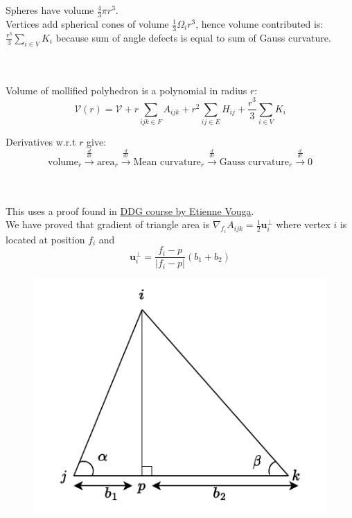 \documentclass{article}
\newcommand\ifrac[2]{{\displaystyle\frac{#1}{#2}}}
\def\grad{\nabla}
\def\hal{\ifrac{1}{2}}
\def\cV{\mathcal{V}}
\begin{document}
\vspace{1.8cm}
\\\\


Spheres have volume $\frac{4}{3}\pi r^3$.\\
Vertices add spherical cones of volume $\frac{1}{3} \Omega_i r^3$, hence volume contributed is:
$\frac{r^3}{3} \sum_{i \in V} K_i$
because sum of angle defects is equal to sum of Gauss curvature.


\vspace{1.8cm}
\\\\


Volume of mollified polyhedron is a polynomial in radius $r$:
$$
    \cV(r) = \cV + r \sum_{ijk \in F} A_{ijk} + r^2  \sum_{ij \in E} H_{ij} + \frac{r^3}{3} \sum_{i \in V} K_i
$$

Derivatives w.r.t $r$ give:\\
$$
    \text{volume}_r \overset{\frac{d}{dr}}{\longrightarrow}
    \text{area}_r \overset{\frac{d}{dr}}{\longrightarrow}
    \text{Mean curvature}_r \overset{\frac{d}{dr}}{\longrightarrow}
    \text{Gauss curvature}_r \overset{\frac{d}{dr}}{\longrightarrow} 0
$$


\pagebreak
{}\\\\

This uses a proof found in \href{https://www.cs.utexas.edu/users/evouga/uploads/4/5/6/8/45689883/notes3.pdf#page=4}{DDG course by Etienne Vouga}.\\
We have proved that gradient of triangle area is $\grad_{f_i} A_{ijk} = \hal \mathbf{u}_i^\perp$
where vertex $i$ is located at position $f_i$ and
$$\mathbf{u}_i^\perp = \ifrac{f_i - p}{|f_i - p|} (b_1 + b_2)$$

\begin{figure}
    \includegraphics[scale=0.8]{figs/tri.pdf}
\end{figure}
\end{document}
